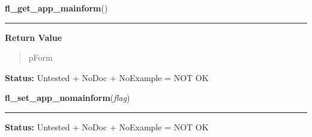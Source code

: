     \label{xformslib:library:fl_get_app_mainform}

    \vspace{0.5ex}

\hspace{.8\funcindent}\begin{boxedminipage}{\funcwidth}

    \raggedright \textbf{fl\_get\_app\_mainform}()

    \vspace{-1.5ex}

    \rule{\textwidth}{0.5\fboxrule}
\setlength{\parskip}{2ex}
\setlength{\parskip}{1ex}
      \textbf{Return Value}
    \vspace{-1ex}

      \begin{quote}
      pForm

      \end{quote}

\textbf{Status:} Untested + NoDoc + NoExample = NOT OK



    \end{boxedminipage}

    \label{xformslib:library:fl_set_app_nomainform}

    \vspace{0.5ex}

\hspace{.8\funcindent}\begin{boxedminipage}{\funcwidth}

    \raggedright \textbf{fl\_set\_app\_nomainform}(\textit{flag})

    \vspace{-1.5ex}

    \rule{\textwidth}{0.5\fboxrule}
\setlength{\parskip}{2ex}
\setlength{\parskip}{1ex}
\textbf{Status:} Untested + NoDoc + NoExample = NOT OK



    \end{boxedminipage}

    \label{xformslib:library:fl_set_form_callback}

